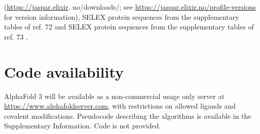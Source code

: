 \documentclass[10pt]{article}
\begin{document}
(\href{https://jaspar.elixir}{https://jaspar.elixir}. no/downloads/; see \href{https://jaspar.elixir.no/profile-versions}{https://jaspar.elixir.no/profile-versions} for version information), SELEX protein sequences from the supplementary tables of ref. 72 and SELEX protein sequences from the supplementary tables of ref. 73 .

\section*{Code availability}
AlphaFold 3 will be available as a non-commercial usage only server at \href{https://www.alphafoldserver.com}{https://www.alphafoldserver.com}, with restrictions on allowed ligands and covalent modifications. Pseudocode describing the algorithms is available in the Supplementary Information. Code is not provided.
\end{document}
